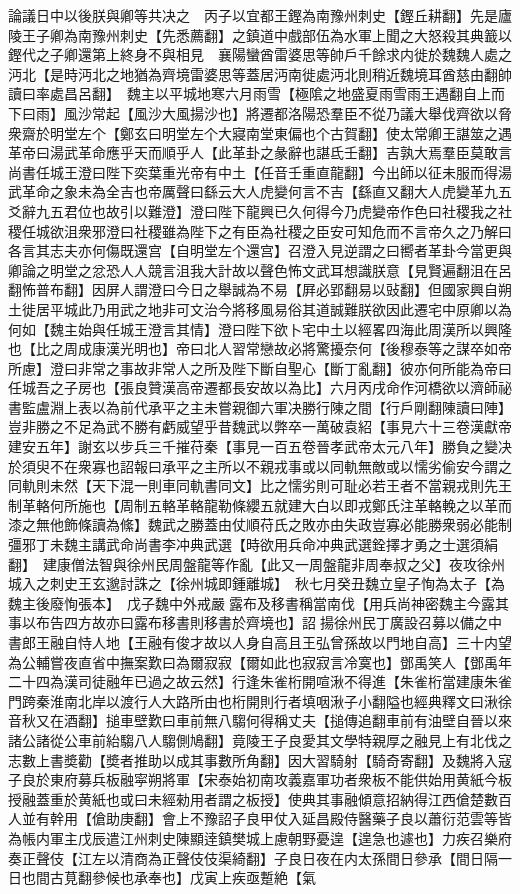 論議日中以後朕與卿等共决之　丙子以宜都王鏗為南豫州刺史【鏗丘耕翻】先是廬陵王子卿為南豫州刺史【先悉薦翻】之鎮道中戲部伍為水軍上聞之大怒殺其典籖以鏗代之子卿還第上終身不與相見　襄陽蠻酋雷婆思等帥戶千餘求内徙於魏魏人處之沔北【是時沔北之地猶為齊境雷婆思等蓋居沔南徙處沔北則稍近魏境耳酋慈由翻帥讀曰率處昌呂翻】　魏主以平城地寒六月雨雪【極隂之地盛夏雨雪雨王遇翻自上而下曰雨】風沙常起【風沙大風揚沙也】將遷都洛陽恐羣臣不從乃議大舉伐齊欲以脅衆齋於明堂左个【鄭玄曰明堂左个大寢南堂東偏也个古賀翻】使太常卿王諶筮之遇革帝曰湯武革命應乎天而順乎人【此革卦之彖辭也諶氐壬翻】吉孰大焉羣臣莫敢言尚書任城王澄曰陛下奕葉重光帝有中土【任音壬重直龍翻】今出師以征未服而得湯武革命之象未為全吉也帝厲聲曰繇云大人虎變何言不吉【繇直又翻大人虎變革九五爻辭九五君位也故引以難澄】澄曰陛下龍興已久何得今乃虎變帝作色曰社稷我之社稷任城欲沮衆邪澄曰社稷雖為陛下之有臣為社稷之臣安可知危而不言帝久之乃解曰各言其志夫亦何傷既還宫【自明堂左个還宫】召澄入見逆謂之曰嚮者革卦今當更與卿論之明堂之忿恐人人競言沮我大計故以聲色怖文武耳想識朕意【見賢遍翻沮在呂翻怖普布翻】因屏人謂澄曰今日之舉誠為不易【屛必郢翻易以䜴翻】但國家興自朔土徙居平城此乃用武之地非可文治今將移風易俗其道誠難朕欲因此遷宅中原卿以為何如【魏主始與任城王澄言其情】澄曰陛下欲卜宅中土以經畧四海此周漢所以興隆也【比之周成康漢光明也】帝曰北人習常戀故必將驚擾奈何【後穆泰等之謀卒如帝所慮】澄曰非常之事故非常人之所及陛下斷自聖心【斷丁亂翻】彼亦何所能為帝曰任城吾之子房也【張良贊漢高帝遷都長安故以為比】六月丙戌命作河橋欲以濟師祕書監盧淵上表以為前代承平之主未嘗親御六軍决勝行陳之間【行戶剛翻陳讀曰陣】豈非勝之不足為武不勝有虧威望乎昔魏武以弊卒一萬破袁紹【事見六十三卷漢獻帝建安五年】謝玄以步兵三千摧苻秦【事見一百五卷晉孝武帝太元八年】勝負之變决於須臾不在衆寡也詔報曰承平之主所以不親戎事或以同軌無敵或以懦劣偷安今謂之同軌則未然【天下混一則車同軌書同文】比之懦劣則可耻必若王者不當親戎則先王制革輅何所施也【周制五輅革輅龍勒條纓五就建大白以即戎鄭氏注革輅輓之以革而漆之無他飾條讀為絛】魏武之勝蓋由仗順苻氏之敗亦由失政豈寡必能勝衆弱必能制彊邪丁未魏主講武命尚書李冲典武選【時欲用兵命冲典武選銓擇才勇之士選須絹翻】　建康僧法智與徐州民周盤龍等作亂【此又一周盤龍非周奉叔之父】夜攻徐州城入之刺史王玄邈討誅之【徐州城即鍾離城】　秋七月癸丑魏立皇子恂為太子【為魏主後廢恂張本】　戊子魏中外戒嚴露布及移書稱當南伐【用兵尚神密魏主今露其事以布告四方故亦曰露布移書則移書於齊境也】詔揚徐州民丁廣設召募以備之中書郎王融自恃人地【王融有俊才故以人身自高且王弘曾孫故以門地自高】三十内望為公輔嘗夜直省中撫案歎曰為爾寂寂【爾如此也寂寂言冷寞也】鄧禹笑人【鄧禹年二十四為漢司徒融年已過之故云然】行逢朱雀桁開喧湫不得進【朱雀桁當建康朱雀門跨秦淮南北岸以渡行人大路所由也桁開則行者填咽湫子小翻隘也經典釋文曰湫徐音秋又在酒翻】搥車壁歎曰車前無八騶何得稱丈夫【搥傳追翻車前有油壁自晉以來諸公諸從公車前紿騶八人騶側鳩翻】竟陵王子良愛其文學特親厚之融見上有北伐之志數上書奬勸【奬者推助以成其事數所角翻】因大習騎射【騎奇寄翻】及魏將入寇子良於東府募兵板融寜朔將軍【宋泰始初南攻義嘉軍功者衆板不能供始用黄紙今板授融蓋重於黄紙也或曰未經勑用者謂之板授】使典其事融傾意招納得江西傖楚數百人並有幹用【傖助庚翻】會上不豫詔子良甲仗入延昌殿侍醫藥子良以蕭衍范雲等皆為帳内軍主戊辰遣江州刺史陳顯逹鎮樊城上慮朝野憂遑【遑急也遽也】力疾召樂府奏正聲伎【江左以清商為正聲伎伎渠綺翻】子良日夜在内太孫間日參承【間日隔一日也間古莧翻參候也承奉也】戊寅上疾亟蹔絶【氣